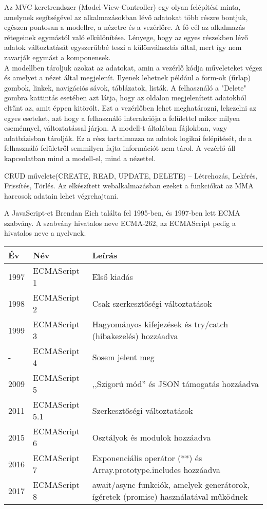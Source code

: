 

Az MVC keretrendszer (Model-View-Controller) egy olyan felépítési minta, amelynek segítségével az alkalmazásokban lévő adatokat több részre bontjuk, egészen pontosan a modellre, a nézetre és a vezérlőre. A fő cél az alkalmazás rétegeinek egymástól való elkülönítése. Lényege, hogy az egyes részekben lévő adatok változtatását egyszerűbbé teszi a különválasztás által, mert így nem zavarják egymást a komponensek. \\A modellben tároljuk azokat az adatokat, amin a vezérlő kódja műveleteket végez és amelyet a nézet által megjelenít. Ilyenek lehetnek például a form-ok (űrlap) gombok, linkek, navigációs sávok, táblázatok, listák. A felhasználó a "Delete" gombra kattintás esetében azt látja, hogy az oldalon megjelenített adatokból eltűnt az, amit éppen kitörölt. Ezt a vezérlőben lehet meghatározni, lekezelni az egyes eseteket, azt hogy a felhasználó interakciója a felülettel mikor milyen eseménnyel, változtatással járjon. A modell-t általában fájlokban, vagy adatbázisban tárolják. Ez a rész tartalmazza az adatok logikai felépítését, de a felhasználó felületről semmilyen fajta információt nem tárol. A vezérlő áll kapcsolatban mind a modell-el, mind a nézettel.

CRUD művelete(CREATE, READ, UPDATE, DELETE) – Létrehozás, Lekérés, Frissítés, Törlés.
Az elkészített webalkalmazásban ezeket a funkciókat az MMA harcosok adatain lehet végrehajtani.



A JavaScript-et Brendan Eich találta fel 1995-ben, és 1997-ben lett ECMA szabvány.
A szabvány hivatalos neve ECMA-262, az ECMAScript pedig a hivatalos neve a nyelvnek.

\begin{tabular}{|l|l|p{8cm}|}
\hline
\textbf{Év} & \textbf{Név} & \textbf{Leírás} \\
\hline
1997 & ECMAScript 1 & Első kiadás \\
\hline
1998 & ECMAScript 2 & Csak szerkesztőségi változtatások \\
\hline
1999 & ECMAScript 3 & Hagyományos kifejezések és try/catch (hibakezelés) hozzáadva \\
\hline
- & ECMAScript 4 & Sosem jelent meg \\
\hline
2009 & ECMAScript 5 & ,,Szigorú mód'' és JSON támogatás hozzáadva \\
\hline
2011 & ECMAScript 5.1 & Szerkesztőségi változtatások \\
\hline
2015 & ECMAScript 6 & Osztályok és modulok hozzáadva \\
\hline
2016 & ECMAScript 7 & Exponenciális operátor (**) és Array.prototype.includes hozzáadva \\
\hline
2017 & ECMAScript 8 & await/async funkciók, amelyek generátorok, ígéretek (promise) használatával működnek \\
\hline
\end{tabular}
\\
\cite{ECMAScript}

